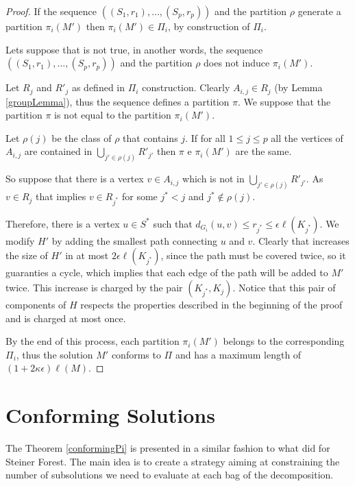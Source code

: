 \begin{proof}
If the sequence \(((S_1, r_1), \dots, (S_p, r_p))\) and the partition \(\rho\) generate a partition \(\pi_i(M')\) then \(\pi_i(M') \in \Pi_i\), by construction of \(\Pi_i\).

Lets suppose that is not true, in another words, the sequence \(((S_1, r_1), \dots, (S_p, r_p))\) and the partition \(\rho\) does not induce \(\pi_i(M')\).

Let \(R_j\) and \(R'_j\) as defined in \(\Pi_i\) construction. Clearly \(A_{i,j} \in R_j\) (by Lemma \ref{groupLemma}), thus the sequence defines a partition \(\pi\). We suppose that the partition \(\pi\) is not equal to the partition \(\pi_i(M')\).

Let \(\rho(j)\) be the class of \(\rho\) that contains \(j\). If for all \(1 \leq j \leq p\) all the vertices of \(A_{i,j}\) are contained in \(\bigcup_{j' \in \rho(j)}R'_{j'}\) then \(\pi\) e \(\pi_i(M')\) are the same.

So suppose that there is a vertex \(v \in A_{i,j}\) which is not in \(\bigcup_{j' \in \rho(j)}R'_{j'}\). As \(v \in R_j\) that implies \(v \in R_{j^\ast}\) for some \(j^\ast < j\) and \(j^\ast \not\in \rho(j)\).

Therefore, there is a vertex \(u \in S^\ast\) such that \(d_{G_i}(u, v) \leq r_{j^\ast} \leq \epsilon \ell(K_{j^\ast})\). We modify \(H'\) by adding the smallest path connecting \(u\) and \(v\). Clearly that increases the size of \(H'\) in at most \(2 \epsilon \ell(K_{j^\ast})\), since the path must be covered twice, so it guaranties a cycle, which implies that each edge of the path will be added to \(M'\) twice. This increase is charged by the pair \((K_{j^\ast}, K_j)\). Notice that this pair of components of \(H\) respects the properties described in the beginning of the proof and is charged at most once.

By the end of this process, each partition \(\pi_i(M')\) belongs to the corresponding \(\Pi_i\), thus the solution \(M'\) conforms to \(\Pi\) and has a maximum length of \((1 + 2\kappa\epsilon) \ell(M)\).

\end{proof}

\section{Conforming Solutions}

The Theorem \ref{conformingPi} is presented in a similar fashion to what \citeauthor{Bateni} did for Steiner Forest. The main idea is to create a strategy aiming at constraining the number of subsolutions we need to evaluate at each bag of the decomposition.


